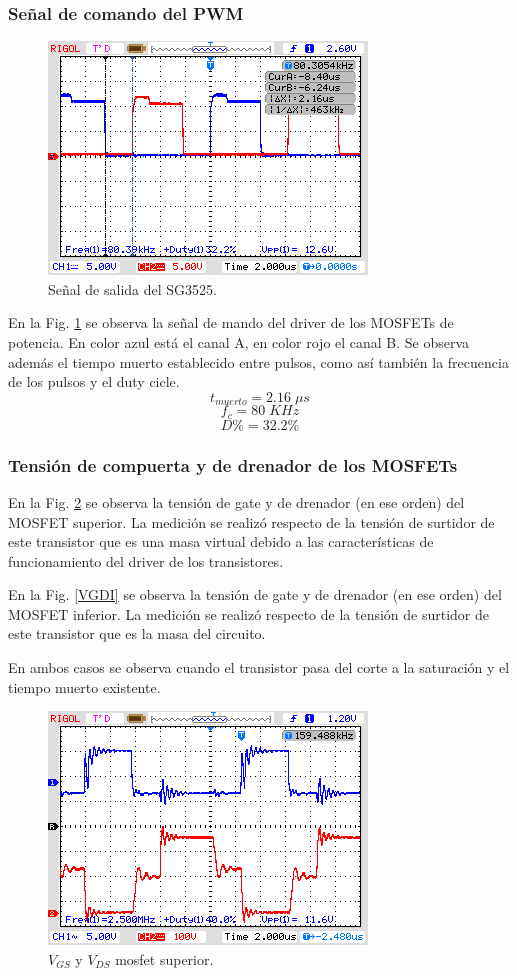 \documentclass[11pt, a4paper]{article}
\begin{document}
\subsubsection{Señal de comando del PWM}
\begin{figure}[H]
	\centering
	\includegraphics[width = 10 cm]{Imagenes/spwm}
	\caption{Señal de salida del SG3525.}
	\label{sPWM}
\end{figure}
En la Fig. \ref{sPWM} se observa la señal de mando del driver de los MOSFETs de potencia. En color azul está el canal A, en color rojo el canal B. Se observa además el tiempo muerto establecido entre pulsos, como así también la frecuencia de los pulsos y el duty cicle.
\[ t_{muerto} = 2.16 \; \mu s \]
\[ f_c = 80 \; KHz\]
\[ D\% = 32.2 \% \]

\subsubsection{Tensión de compuerta y de drenador de los MOSFETs}
En la Fig. \ref{VGDS} se observa la tensión de gate y de drenador (en ese orden) del MOSFET superior. La medición se realizó respecto de la tensión de surtidor de este transistor que es una masa virtual debido a las características de funcionamiento del driver de los transistores.

En la Fig. \ref{VGDI} se observa la tensión de gate y de drenador (en ese orden) del MOSFET inferior. La medición se realizó respecto de la tensión de surtidor de este transistor que es la masa del circuito.

En ambos casos se observa cuando el transistor pasa del corte a la saturación y el tiempo muerto existente.
 
\begin{figure}[H]
	\centering
	\includegraphics[width = 8 cm]{Imagenes/VGDs}
	\caption{$V_{GS}$ y $V_{DS}$ mosfet superior.}
	\label{VGDS}
\end{figure}
\end{document}
